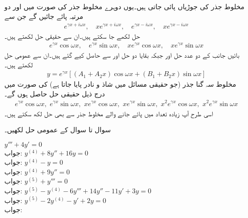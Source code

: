 مخلوط جذر کی جوڑیاں پائی جاتی ہیں۔یوں دوہرے مخلوط جذر کی صورت میں   اور  دو مرتبہ پائے جائیں گے جن سے 
\begin{align*}
e^{\gamma x+i\omega x}, \quad xe^{\gamma x+i\omega x}, \quad e^{\gamma x-i\omega x}, \quad xe^{\gamma x-i\omega x}
\end{align*}
حل لکھے جا سکتے ہیں۔ان سے حقیقی حل لکھتے ہیں۔
\begin{align}
e^{\gamma x}\cos \omega x,\quad  e^{\gamma x}\sin \omega x,\quad   xe^{\gamma x}\cos \omega x,\quad xe^{\gamma x}\sin \omega x 
\end{align}
بائیں جانب کے دو عدد حل  اور  جبکہ بقایا دو
 حل  اور   سے حاصل کیے گئے ہیں۔ان سے عمومی حل لکھتے ہیں۔
\begin{align}
y=e^{\gamma x}[(A_1+A_2 x)\cos \omega x+(B_1+B_2 x)\sin \omega x]
\end{align}
مخلوط سہ گنا جذر (جو حقیقی مسائل میں شاذ و نادر  پایا جاتا ہے) کی صورت میں درج ذیل حقیقی حل حاصل ہوں گے۔
\begin{align*}
e^{\gamma x}\cos \omega x,\,\,  e^{\gamma x}\sin \omega x,\,\,   xe^{\gamma x}\cos \omega x,\,\, xe^{\gamma x}\sin \omega x,\,\,   x^2e^{\gamma x}\cos \omega x,\,\, x^2e^{\gamma x}\sin \omega x 
\end{align*}
اسی طرح آپ زیادہ تعداد میں پائے جانے والے مخلوط جذر سے بھی حل لکھ سکتے ہیں۔



سوال  تا سوال  کے  عمومی حل لکھیں۔

\quad
$y'''+4y'=0$\\
جواب:
\quad
$y^{(4)}+8y''+16y=0$\\
جواب:
\quad
$y^{(4)}-y=0$\\
جواب:
\quad
$y^{(4)}+9y''=0$\\
جواب:
\quad
$y^{(5)}+y'''=0$\\
جواب:
\quad 
$y^{(5)}-y^{(4)}-6y'''+14y''-11y'+3y=0$\\
جواب:
\quad
$y^{(5)}-2y^{(4)}-y'+2y=0$\\
جواب:

